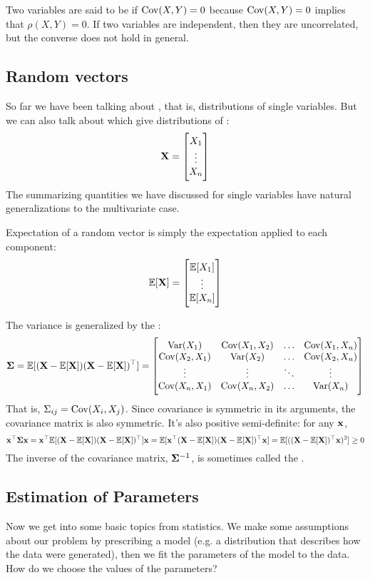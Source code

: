 Two variables are said to be  if $\operatorname{Cov}(X, Y) = 0$ because $\operatorname{Cov}(X, Y) = 0$ implies that $\rho(X, Y) = 0$.
If two variables are independent, then they are uncorrelated, but the converse does not hold in general.

\subsection{Random vectors}
So far we have been talking about , that is, distributions of single variables.
But we can also talk about  which give distributions of :
\[\mathbf{X} = \begin{bmatrix}X_1 \\ \vdots \\ X_n\end{bmatrix}\]
The summarizing quantities we have discussed for single variables have natural generalizations to the multivariate case.

Expectation of a random vector is simply the expectation applied to each component:
\[\mathbb{E}[\mathbf{X}] = \begin{bmatrix}\mathbb{E}[X_1] \\ \vdots \\ \mathbb{E}[X_n]\end{bmatrix}\]

The variance is generalized by the :
\[\mathbf{\Sigma} = \mathbb{E}[(\mathbf{X} - \mathbb{E}[\mathbf{X}])(\mathbf{X} - \mathbb{E}[\mathbf{X}])^\top] = \begin{bmatrix}
\operatorname{Var}(X_1) & \operatorname{Cov}(X_1, X_2) & \hdots & \operatorname{Cov}(X_1, X_n) \\
\operatorname{Cov}(X_2, X_1) & \operatorname{Var}(X_2) & \hdots & \operatorname{Cov}(X_2, X_n) \\
\vdots & \vdots & \ddots & \vdots \\
\operatorname{Cov}(X_n, X_1) & \operatorname{Cov}(X_n, X_2) & \hdots & \operatorname{Var}(X_n)
\end{bmatrix}\]
That is, $\Sigma_{ij} = \operatorname{Cov}(X_i, X_j)$.
Since covariance is symmetric in its arguments, the covariance matrix is also symmetric.
It's also positive semi-definite: for any $\mathbf{x}$,
\[\mathbf{x}^\top\mathbf{\Sigma}\mathbf{x} = \mathbf{x}^\top\mathbb{E}[(\mathbf{X} - \mathbb{E}[\mathbf{X}])(\mathbf{X} - \mathbb{E}[\mathbf{X}])^\top]\mathbf{x} = \mathbb{E}[\mathbf{x}^\top(\mathbf{X} - \mathbb{E}[\mathbf{X}])(\mathbf{X} - \mathbb{E}[\mathbf{X}])^\top\mathbf{x}] = \mathbb{E}[((\mathbf{X} - \mathbb{E}[\mathbf{X}])^\top\mathbf{x})^2] \geq 0\]
The inverse of the covariance matrix, $\mathbf{\Sigma}^{-1}$, is sometimes called the .

\subsection{Estimation of Parameters}
Now we get into some basic topics from statistics.
We make some assumptions about our problem by prescribing a  model (e.g. a distribution that describes how the data were generated), then we fit the parameters of the model to the data.
How do we choose the values of the parameters?

